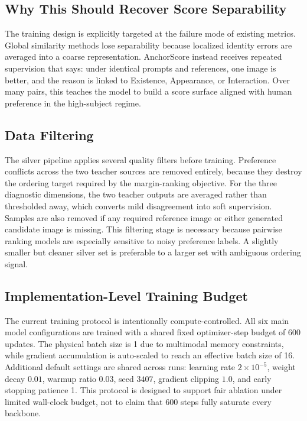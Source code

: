\subsection{Why This Should Recover Score Separability}
The training design is explicitly targeted at the failure mode of existing metrics. Global similarity methods lose separability because localized identity errors are averaged into a coarse representation. AnchorScore instead receives repeated supervision that says: under identical prompts and references, one image is better, and the reason is linked to Existence, Appearance, or Interaction. Over many pairs, this teaches the model to build a score surface aligned with human preference in the high-subject regime.

\subsection{Data Filtering}
The silver pipeline applies several quality filters before training. Preference conflicts across the two teacher sources are removed entirely, because they destroy the ordering target required by the margin-ranking objective. For the three diagnostic dimensions, the two teacher outputs are averaged rather than thresholded away, which converts mild disagreement into soft supervision. Samples are also removed if any required reference image or either generated candidate image is missing. This filtering stage is necessary because pairwise ranking models are especially sensitive to noisy preference labels. A slightly smaller but cleaner silver set is preferable to a larger set with ambiguous ordering signal.

\subsection{Implementation-Level Training Budget}
The current training protocol is intentionally compute-controlled. All six main model configurations are trained with a shared fixed optimizer-step budget of 600 updates. The physical batch size is 1 due to multimodal memory constraints, while gradient accumulation is auto-scaled to reach an effective batch size of 16. Additional default settings are shared across runs: learning rate $2\times 10^{-5}$, weight decay $0.01$, warmup ratio $0.03$, seed $3407$, gradient clipping $1.0$, and early stopping patience 1. This protocol is designed to support fair ablation under limited wall-clock budget, not to claim that 600 steps fully saturate every backbone.

